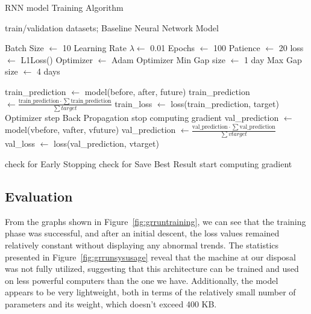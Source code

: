 \begin{algorithm}[H]
	\caption{RNN model Training Algorithm}\label{alg:grruntraining}
	\begin{algorithmic}
		\Require train/validation datasets; Baseline Neural Network Model

		\State Batch Size $\gets$ 10
		\State Learning Rate $\lambda \gets$ 0.01
		\State Epochs $\gets$ 100
		\State Patience $\gets$ 20
		\State loss $\gets$ L1Loss()
		\State Optimizer $\gets$ Adam Optimizer
		\State Min Gap size $\gets$ 1 day
		\State Max Gap size $\gets$ 4 days
		\State

		\State train\_prediction $\gets$ model(before, after, future) 
		\State train\_prediction $\gets \frac{\text{train\_prediction} \cdot \sum\text{train\_prediction}}{\sum target}$ 
		\State train\_loss $\gets$ loss(train\_prediction, target)
		\State Optimizer step
		\State Back Propagation
		\EndFor
		\State stop computing gradient
		\State val\_prediction $\gets$ model(vbefore, vafter, vfuture) 
		\State val\_prediction $\gets \frac{\text{val\_prediction} \cdot \sum\text{val\_prediction}}{\sum vtarget}$ 
		\State val\_loss $\gets$ loss(val\_prediction, vtarget)
		\EndFor

		\State check for Early Stopping
		\State check for Save Best Result
		\State start computing gradient
		\EndFor
	\end{algorithmic}
\end{algorithm}

\subsection{Evaluation}
From the graphs shown in Figure~\ref{fig:grruntraining},
we can see that the training phase was successful,
and after an initial descent, the loss values remained relatively
constant without displaying any abnormal trends.
The statistics presented in Figure~\ref{fig:grrunsysusage} reveal
that the machine at our disposal was not fully utilized,
suggesting that this architecture can be trained and used on
less powerful computers than the one we have.
Additionally, the model appears to be very lightweight, both in terms
of the relatively small number of parameters and its weight,
which doesn't exceed 400 KB.

